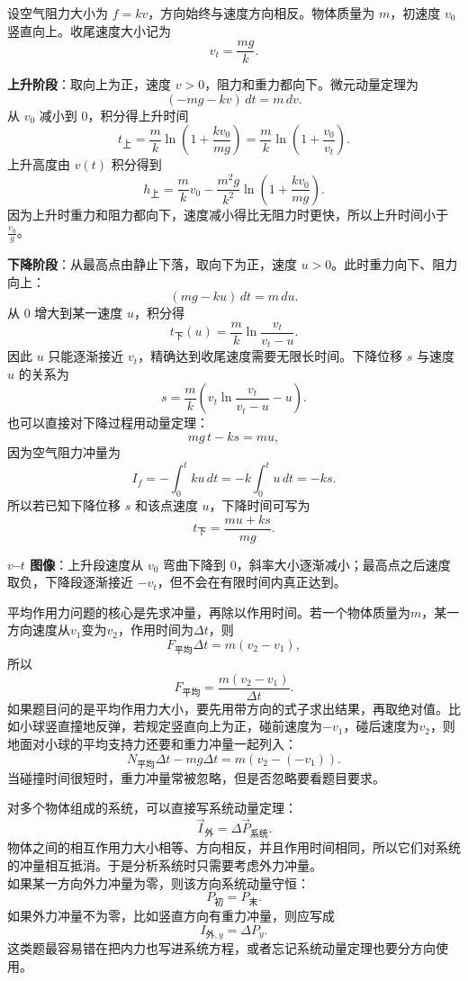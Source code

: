 \begin{casetypebox}[title={\strut\textcolor{white}{\bfseries 常见题型：线性空气阻力下的竖直上抛}}]
设空气阻力大小为 $f=kv$，方向始终与速度方向相反。物体质量为 $m$，初速度 $v_0$ 竖直向上。收尾速度大小记为
\[
  v_t=\frac{mg}{k}.
\]

\textbf{上升阶段}：取向上为正，速度 $v>0$，阻力和重力都向下。微元动量定理为
\[
  (-mg-kv)\,dt=m\,dv.
\]
从 $v_0$ 减小到 $0$，积分得上升时间
\[
  t_{\text{上}}=\frac{m}{k}\ln\left(1+\frac{kv_0}{mg}\right)
  =\frac{m}{k}\ln\left(1+\frac{v_0}{v_t}\right).
\]
上升高度由 $v(t)$ 积分得到
\[
  h_{\text{上}}=\frac{m}{k}v_0-\frac{m^2g}{k^2}
  \ln\left(1+\frac{kv_0}{mg}\right).
\]
因为上升时重力和阻力都向下，速度减小得比无阻力时更快，所以上升时间小于 $\frac{v_0}{g}$。

\textbf{下降阶段}：从最高点由静止下落，取向下为正，速度 $u>0$。此时重力向下、阻力向上：
\[
  (mg-ku)\,dt=m\,du.
\]
从 $0$ 增大到某一速度 $u$，积分得
\[
  t_{\text{下}}(u)=\frac{m}{k}\ln\frac{v_t}{v_t-u}.
\]
因此 $u$ 只能逐渐接近 $v_t$，精确达到收尾速度需要无限长时间。下降位移 $s$ 与速度 $u$ 的关系为
\[
  s=\frac{m}{k}\left(v_t\ln\frac{v_t}{v_t-u}-u\right).
\]
也可以直接对下降过程用动量定理：
\[
  mg\,t-ks=mu,
\]
因为空气阻力冲量为
\[
  I_f=-\int_0^t ku\,dt=-k\int_0^t u\,dt=-ks.
\]
所以若已知下降位移 $s$ 和该点速度 $u$，下降时间可写为
\[
  t_{\text{下}}=\frac{mu+ks}{mg}.
\]

\textbf{$v$--$t$ 图像}：上升段速度从 $v_0$ 弯曲下降到 $0$，斜率大小逐渐减小；最高点之后速度取负，下降段逐渐接近 $-v_t$，但不会在有限时间内真正达到。
\begin{center}
  
\end{center}
\end{casetypebox}

\begin{casetypebox}[title={\strut\textcolor{white}{\bfseries 常见题型：平均作用力}}]
平均作用力问题的核心是先求冲量，再除以作用时间。若一个物体质量为$m$，某一方向速度从$v_1$变为$v_2$，作用时间为$\Delta t$，则
\[
  F_{\text{平均}}\Delta t=m(v_2-v_1),
\]
所以
\[
  F_{\text{平均}}=\frac{m(v_2-v_1)}{\Delta t}.
\]
如果题目问的是平均作用力大小，要先用带方向的式子求出结果，再取绝对值。比如小球竖直撞地反弹，若规定竖直向上为正，碰前速度为$-v_1$，碰后速度为$v_2$，则地面对小球的平均支持力还要和重力冲量一起列入：
\[
  N_{\text{平均}}\Delta t-mg\Delta t=m(v_2-(-v_1)).
\]
当碰撞时间很短时，重力冲量常被忽略，但是否忽略要看题目要求。
\end{casetypebox}

\begin{casetypebox}[title={\strut\textcolor{white}{\bfseries 常见题型：系统动量定理}}]
对多个物体组成的系统，可以直接写系统动量定理：
\[
  \vec I_{\text{外}}=\Delta\vec P_{\text{系统}}.
\]
物体之间的相互作用力大小相等、方向相反，并且作用时间相同，所以它们对系统的冲量相互抵消。于是分析系统时只需要考虑外力冲量。\\
如果某一方向外力冲量为零，则该方向系统动量守恒：
\[
  P_{\text{初}}=P_{\text{末}}.
\]
如果外力冲量不为零，比如竖直方向有重力冲量，则应写成
\[
  I_{\text{外},y}=\Delta P_y.
\]
这类题最容易错在把内力也写进系统方程，或者忘记系统动量定理也要分方向使用。
\end{casetypebox}

